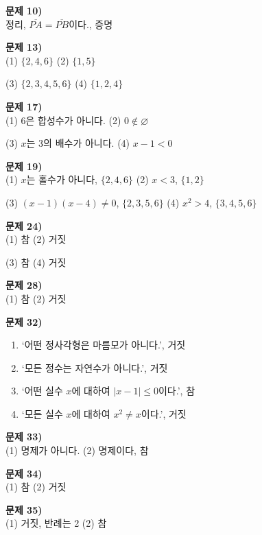 \documentclass{oblivoir}
\newcounter{num}
\newcommand\an[1]{\par\bigskip\noindent\textbf{문제 #1)}\\}
\begin{document}
%
\an{10}
정리, \(\overline{PA}=\overline{PB}\)이다., 증명

%
\an{13}
(1)\:\:
\(\{2,4,6\}\)
 (2)\:\:
\(\{1,5\}\)
\par\noindent (3)\:\:
\(\{2,3,4,5,6\}\)
 (4)\:\:
\(\{1,2,4\}\)

%
\an{17}
(1)\:\:
\(6\)은 합성수가 아니다.
 (2)\:\:
\(0\notin\varnothing\)
\par\noindent (3)\:\:
\(x\)는 3의 배수가 아니다.
 (4)\:\:
\(x-1<0\)

%
\an{19}
(1)\:\:
\(x\)는 홀수가 아니다, \(\{2,4,6\}\)
 (2)\:\:
\(x<3\), \(\{1,2\}\)
\par\noindent (3)\:\:
\((x-1)(x-4)\neq0\), \(\{2,3,5,6\}\)
 (4)\:\:
\(x^2>4\), \(\{3,4,5,6\}\)

%
\an{24}
(1)\:\:
참
 (2)\:\:
거짓
\par\noindent (3)\:\:
참
 (4)\:\:
거짓

%
\an{28}
(1)\:\:
참
 (2)\:\:
거짓

%
\an{32}
\begin{enumerate}
\item
`어떤 정사각형은 마름모가 아니다.', 거짓
\item
`모든 정수는 자연수가 아니다.', 거짓
\item
`어떤 실수 \(x\)에 대하여 \(|x-1|\le0\)이다.', 참
\item
`모든 실수 \(x\)에 대하여 \(x^2\neq x\)이다.', 거짓
\end{enumerate}

%
\an{33}
(1)\:\:
명제가 아니다.
 (2)\:\:
명제이다, 참

%
\an{34}
(1)\:\:
참
 (2)\:\:
거짓

%
\an{35}
(1)\:\:
거짓, 반례는 2
 (2)\:\:
참
\end{document}

